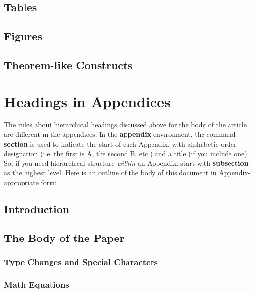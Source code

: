 \documentclass{acm_proc_article-sp}
\begin{document}
\subsection{Tables}

\subsection{Figures}

\subsection{Theorem-like Constructs}


%

%
%
\appendix
\section{Headings in Appendices}
The rules about hierarchical headings discussed above for
the body of the article are different in the appendices.
In the \textbf{appendix} environment, the command
\textbf{section} is used to
indicate the start of each Appendix, with alphabetic order
designation (i.e. the first is A, the second B, etc.) and
a title (if you include one).  So, if you need
hierarchical structure
\textit{within} an Appendix, start with \textbf{subsection} as the
highest level. Here is an outline of the body of this
document in Appendix-appropriate form:
\subsection{Introduction}
\subsection{The Body of the Paper}
\subsubsection{Type Changes and  Special Characters}
\subsubsection{Math Equations}
\end{document}
